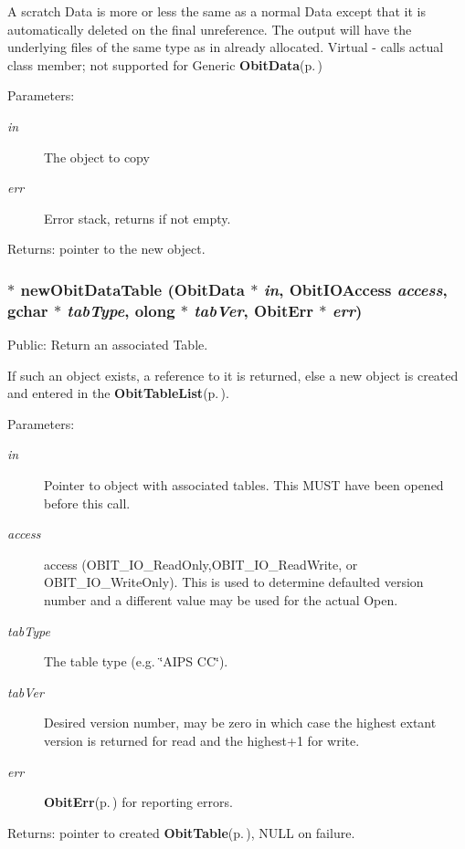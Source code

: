 A scratch Data is more or less the same as a normal Data except that it is automatically deleted on the final unreference. The output will have the underlying files of the same type as in already allocated. Virtual - calls actual class member; not supported for Generic {\bf Obit\-Data}{\rm (p.\,\pageref{structObitData})} \begin{Desc}
\item[Parameters:]
\begin{description}
\item[{\em in}]The object to copy \item[{\em err}]Error stack, returns if not empty. \end{description}
\end{Desc}
\begin{Desc}
\item[Returns:]pointer to the new object. \end{Desc}
\subsubsection{$\ast$ new\-Obit\-Data\-Table ({\bf Obit\-Data} $\ast$ {\em in}, Obit\-IOAccess {\em access}, gchar $\ast$ {\em tab\-Type}, {\bf olong} $\ast$ {\em tab\-Ver}, {\bf Obit\-Err} $\ast$ {\em err})}\label{ObitData_8h_a41}


Public: Return an associated Table. 

If such an object exists, a reference to it is returned, else a new object is created and entered in the {\bf Obit\-Table\-List}{\rm (p.\,\pageref{structObitTableList})}. \begin{Desc}
\item[Parameters:]
\begin{description}
\item[{\em in}]Pointer to object with associated tables. This MUST have been opened before this call. \item[{\em access}]access (OBIT\_\-IO\_\-Read\-Only,OBIT\_\-IO\_\-Read\-Write, or OBIT\_\-IO\_\-Write\-Only). This is used to determine defaulted version number and a different value may be used for the actual Open. \item[{\em tab\-Type}]The table type (e.g. \char`\"{}AIPS CC\char`\"{}). \item[{\em tab\-Ver}]Desired version number, may be zero in which case the highest extant version is returned for read and the highest+1 for write. \item[{\em err}]{\bf Obit\-Err}{\rm (p.\,\pageref{structObitErr})} for reporting errors. \end{description}
\end{Desc}
\begin{Desc}
\item[Returns:]pointer to created {\bf Obit\-Table}{\rm (p.\,\pageref{structObitTable})}, NULL on failure. \end{Desc}
